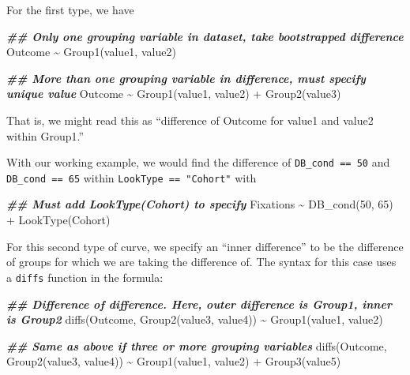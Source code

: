 \documentclass[
]{article}
\newenvironment{Shaded}{\begin{snugshade}}{\end{snugshade}}
\newcommand{\DecValTok}[1]{\textcolor[rgb]{0.00,0.00,0.81}{#1}}
\newcommand{\DocumentationTok}[1]{\textcolor[rgb]{0.56,0.35,0.01}{\textbf{\textit{#1}}}}
\newcommand{\FunctionTok}[1]{\textcolor[rgb]{0.00,0.00,0.00}{#1}}
\newcommand{\NormalTok}[1]{#1}
\newcommand{\SpecialCharTok}[1]{\textcolor[rgb]{0.00,0.00,0.00}{#1}}
\begin{document}
For the first type, we have

\begin{Shaded}
\begin{Highlighting}[]
\DocumentationTok{\#\# Only one grouping variable in dataset, take bootstrapped difference}
\NormalTok{Outcome }\SpecialCharTok{\textasciitilde{}} \FunctionTok{Group1}\NormalTok{(value1, value2)}

\DocumentationTok{\#\# More than one grouping variable in difference, must specify unique value}
\NormalTok{Outcome }\SpecialCharTok{\textasciitilde{}} \FunctionTok{Group1}\NormalTok{(value1, value2) }\SpecialCharTok{+} \FunctionTok{Group2}\NormalTok{(value3)}
\end{Highlighting}
\end{Shaded}

That is, we might read this as ``difference of Outcome for value1 and
value2 within Group1.''

With our working example, we would find the difference of
\texttt{DB\_cond\ ==\ 50} and \texttt{DB\_cond\ ==\ 65} within
\texttt{LookType\ ==\ "Cohort"} with

\begin{Shaded}
\begin{Highlighting}[]
\DocumentationTok{\#\# Must add LookType(Cohort) to specify}
\NormalTok{Fixations }\SpecialCharTok{\textasciitilde{}} \FunctionTok{DB\_cond}\NormalTok{(}\DecValTok{50}\NormalTok{, }\DecValTok{65}\NormalTok{) }\SpecialCharTok{+} \FunctionTok{LookType}\NormalTok{(Cohort)}
\end{Highlighting}
\end{Shaded}

For this second type of curve, we specify an ``inner difference'' to be
the difference of groups for which we are taking the difference of. The
syntax for this case uses a \texttt{diffs} function in the formula:

\begin{Shaded}
\begin{Highlighting}[]
\DocumentationTok{\#\# Difference of difference. Here, outer difference is Group1, inner is Group2}
\FunctionTok{diffs}\NormalTok{(Outcome, }\FunctionTok{Group2}\NormalTok{(value3, value4)) }\SpecialCharTok{\textasciitilde{}} \FunctionTok{Group1}\NormalTok{(value1, value2)}

\DocumentationTok{\#\# Same as above if three or more grouping variables}
\FunctionTok{diffs}\NormalTok{(Outcome, }\FunctionTok{Group2}\NormalTok{(value3, value4)) }\SpecialCharTok{\textasciitilde{}} \FunctionTok{Group1}\NormalTok{(value1, value2) }\SpecialCharTok{+} \FunctionTok{Group3}\NormalTok{(value5)}
\end{Highlighting}
\end{Shaded}
\end{document}
